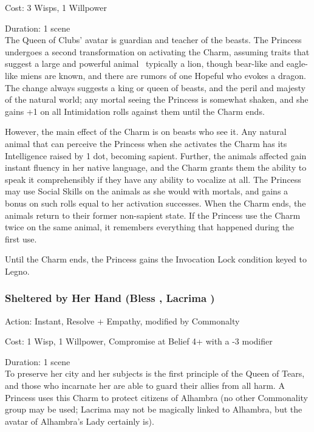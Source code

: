\noindent Cost: 3 Wisps, 1 Willpower

\noindent Duration: 1 scene \\

\noindent The Queen of Clubs' avatar is guardian and teacher of the beasts. The Princess undergoes a second transformation on activating the Charm, assuming traits that suggest a large and powerful animal \textendash\, typically a lion, though bear-like and eagle-like miens are known, and there are rumors of one Hopeful who evokes a dragon. The change always suggests a king or queen of beasts, and the peril and majesty of the natural world; any mortal seeing the Princess is somewhat shaken, and she gains +1 on all Intimidation rolls against them until the Charm ends.

However, the main effect of the Charm is on beasts who see it. Any natural animal that can perceive the Princess when she activates the Charm has its Intelligence raised by 1 dot, becoming sapient. Further, the animals affected gain instant fluency in her native language, and the Charm grants them the ability to speak it comprehensibly if they have any ability to vocalize at all. The Princess may use Social Skills on the animals as she would with mortals, and gains a bonus on such rolls equal to her activation successes. When the Charm ends, the animals return to their former non-sapient state. If the Princess use the Charm twice on the same animal, it remembers everything that happened during the first use.

Until the Charm ends, the Princess gains the Invocation Lock condition keyed to Legno.

\subsubsection*{Sheltered by Her Hand (Bless \textbullet\textbullet\textbullet\textbullet\textbullet, Lacrima \textbullet\textbullet\textbullet\textbullet)}

\noindent Action: Instant, Resolve + Empathy, modified by Commonalty

\noindent Cost: 1 Wisp, 1 Willpower, Compromise at Belief 4+ with a -3 modifier

\noindent Duration: 1 scene \\

\noindent To preserve her city and her subjects is the first principle of the Queen of Tears, and those who incarnate her are able to guard their allies from all harm. A Princess uses this Charm to protect citizens of Alhambra (no other Commonality group may be used; Lacrima may not be magically linked to Alhambra, but the avatar of Alhambra's Lady certainly is).

